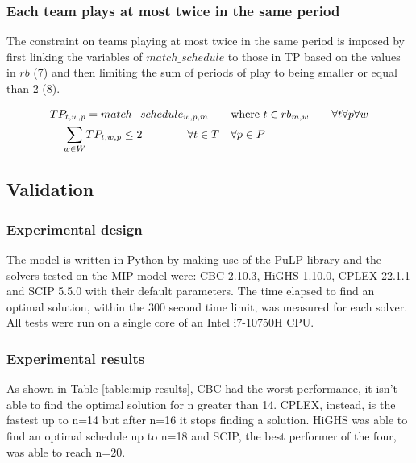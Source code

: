 \subsubsection{Each team plays at most twice in the same period}
The constraint on teams playing at most twice in the same period is imposed by first linking the variables of $match\_schedule$ to those in TP based on the values in $rb$ (7) and then limiting the sum of periods of play to being smaller or equal than 2 (8). 

\begin{align}
    TP_{t,w,p} &= match\_schedule_{w,p,m} \hspace{20px} \text{where}\ t \in rb_{m, w} \hspace{20px} \forall t \forall p  \forall w\\
    \sum_{w \in W} &TP_{t,w,p} \leq 2 \hspace{40px} \forall t \in T \hspace{10px} \forall p \in P
\end{align}

\subsection{Validation}
\subsubsection*{Experimental design}
The model is written in Python by making use of the PuLP library and the solvers tested on the MIP model were: CBC 2.10.3, HiGHS 1.10.0, CPLEX 22.1.1 and SCIP 5.5.0 with their default parameters. The time elapsed to find an optimal solution, within the 300 second time limit, was measured for each solver. All tests were run on a single core of an Intel i7-10750H CPU.

\subsubsection*{Experimental results}
As shown in Table \ref{table:mip-results}, CBC had the worst performance, it isn't able to find the optimal solution for n greater than 14. CPLEX, instead, is the fastest up to n=14 but after n=16 it stops finding a solution. HiGHS was able to find an optimal schedule up to n=18 and SCIP, the best performer of the four, was able to reach n=20.

